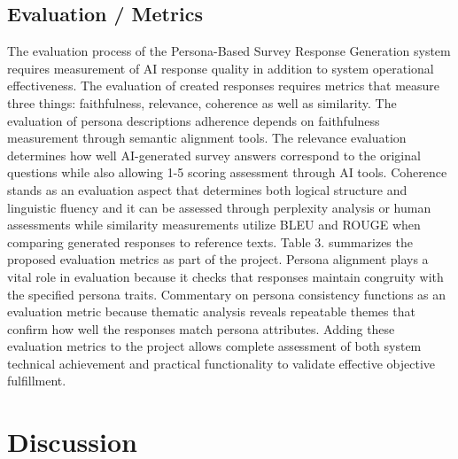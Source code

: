 \documentclass[11pt]{article}
\begin{document}
\subsection{Evaluation / Metrics}

The evaluation process of the Persona-Based Survey Response Generation system requires measurement of AI response quality in addition to system operational effectiveness. The evaluation of created responses requires metrics that measure three things: faithfulness, relevance, coherence as well as similarity. The evaluation of persona descriptions adherence depends on faithfulness measurement through semantic alignment tools. The relevance evaluation determines how well AI-generated survey answers correspond to the original questions while also allowing 1-5 scoring assessment through AI tools. Coherence stands as an evaluation aspect that determines both logical structure and linguistic fluency and it can be assessed through perplexity analysis or human assessments while similarity measurements utilize BLEU and ROUGE when comparing generated responses to reference texts. Table 3. summarizes the proposed evaluation metrics as part of the project.
Persona alignment plays a vital role in evaluation because it checks that responses maintain congruity with the specified persona traits. Commentary on persona consistency functions as an evaluation metric because thematic analysis reveals repeatable themes that confirm how well the responses match persona attributes. Adding these evaluation metrics to the project allows complete assessment of both system technical achievement and practical functionality to validate effective objective fulfillment.

\section{Discussion}
\end{document}
